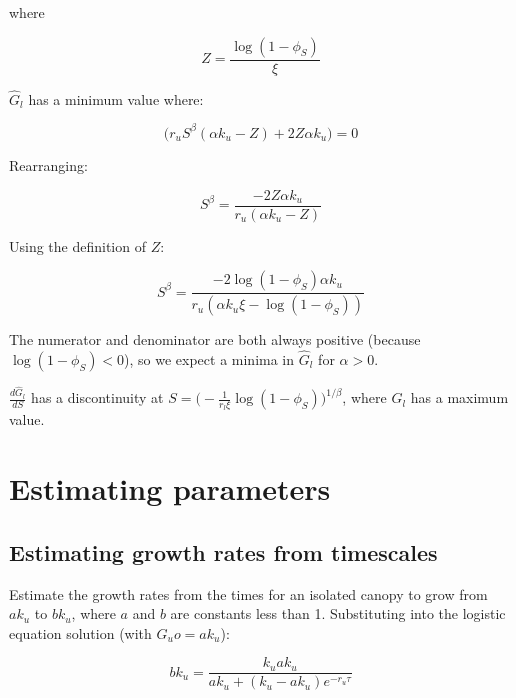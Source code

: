 \documentclass{article}
\begin{document}
    
    where
    
    \begin{equation}
    Z = \frac{\log({1-\phi_S})}{\xi}
    \end{equation}
    
     $ \hat{G}_l$  has a minimum value where:
    
      \begin{equation}
      \big( {r_u} S^{\beta }(\alpha  {k_u}  - Z) +2 Z \alpha  {k_u} \big) = 0
    \end{equation}
    
    Rearranging:
    
      \begin{equation}
     S^{\beta } = \frac{-2 Z \alpha  {k_u} }{{r_u}(\alpha  {k_u}  - Z)  }
    \end{equation}
    
    Using the definition of $Z$:
    
      \begin{equation}
     S^{\beta } = \frac{-2 {\log({1-\phi_S})} \alpha  {k_u} }{{r_u}(\alpha  {k_u} \xi - {\log({1-\phi_S})})  }
    \end{equation}
    
    The numerator and denominator are both always positive (because $\log(1-\phi_S) < 0$), so we expect a minima in $\hat G_l$ for $\alpha > 0$.
    
     $\frac{d \hat{G}_l}{dS}$ has a discontinuity at  $ S = \big( - \frac{1}{r_l \xi }\log (1 - \phi_S)\big)^{1/\beta}$, where $G_l$ has a maximum value.
    


\section{Estimating parameters}
\subsection{Estimating growth rates from timescales}

Estimate the growth rates from the times for an isolated canopy to grow from $a k_u$ to $b k_u$, where $a$ and $b$ are constants less than 1.
Substituting into the logistic equation solution (with $ G_uo = a k_u$):

\begin{equation}
    b k_u = \frac{k_u  a k_u }{ a k_u +(k_u- a k_u) e^{-r_u \tau}}
\end{equation}
\end{document}
